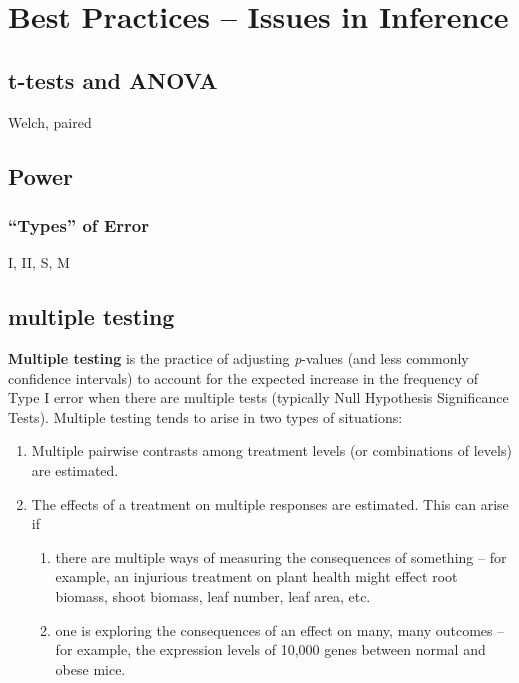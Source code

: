 \documentclass[]{book}
\providecommand{\tightlist}{%
  \setlength{\itemsep}{0pt}\setlength{\parskip}{0pt}}
\begin{document}
\chapter{Best Practices -- Issues in
Inference}\label{best-practices-issues-in-inference}

\section{t-tests and ANOVA}\label{t-tests-and-anova}

Welch, paired

\section{Power}\label{power}

\subsection{\texorpdfstring{``Types'' of
Error}{Types of Error}}\label{types-of-error}

I, II, S, M

\section{multiple testing}\label{multiple-testing}

\textbf{Multiple testing} is the practice of adjusting \emph{p}-values
(and less commonly confidence intervals) to account for the expected
increase in the frequency of Type I error when there are multiple tests
(typically Null Hypothesis Significance Tests). Multiple testing tends
to arise in two types of situations:

\begin{enumerate}
\def\labelenumi{\arabic{enumi}.}
\tightlist
\item
  Multiple pairwise contrasts among treatment levels (or combinations of
  levels) are estimated.
\item
  The effects of a treatment on multiple responses are estimated. This
  can arise if

  \begin{enumerate}
  \def\labelenumii{\alph{enumii}.}
  \tightlist
  \item
    there are multiple ways of measuring the consequences of something
    -- for example, an injurious treatment on plant health might effect
    root biomass, shoot biomass, leaf number, leaf area, etc.
  \item
    one is exploring the consequences of an effect on many, many
    outcomes -- for example, the expression levels of 10,000 genes
    between normal and obese mice.
  \end{enumerate}
\end{enumerate}
\end{document}
